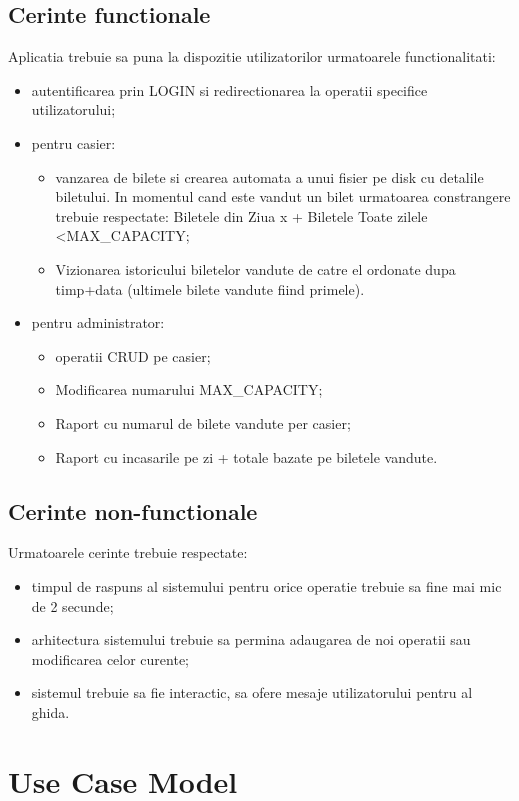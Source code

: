 \documentclass[11pt,a4paper,twoside,notitlepage]{article}
\begin{document}
\subsection{Cerinte functionale}
Aplicatia trebuie sa puna la dispozitie utilizatorilor urmatoarele functionalitati:
\begin{itemize}
	\item autentificarea prin LOGIN si redirectionarea la operatii specifice utilizatorului;
	\item pentru casier:
					\begin{itemize}
						\item	vanzarea de bilete si crearea automata a unui fisier pe disk cu detalile biletului. In momentul cand este vandut un bilet urmatoarea constrangere trebuie respectate: Biletele din Ziua x + Biletele Toate zilele \textless  MAX\_CAPACITY;
						\item 	Vizionarea istoricului biletelor vandute de catre el ordonate dupa timp+data (ultimele bilete vandute fiind primele).
					\end{itemize}
	\item pentru administrator:
					\begin{itemize}
						\item	operatii CRUD pe casier;
						\item	Modificarea numarului MAX\_CAPACITY;
						\item	Raport cu numarul de bilete vandute per casier;
						\item	Raport cu incasarile pe zi + totale bazate pe biletele vandute.
					\end{itemize}
\end{itemize}

\subsection{Cerinte non-functionale}
Urmatoarele cerinte trebuie respectate:
\begin{itemize}
	\item	timpul de raspuns al sistemului pentru orice operatie trebuie sa fine mai mic de 2 secunde;
	\item	arhitectura sistemului trebuie sa permina adaugarea de noi operatii sau modificarea celor curente;
	\item	sistemul trebuie sa fie interactic, sa ofere mesaje utilizatorului pentru al ghida.
\end{itemize}


\section{Use Case Model}
\end{document}
